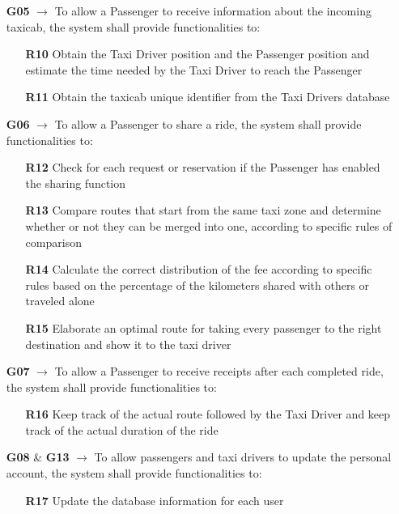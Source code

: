 \begin{itemize}
	\item [\textbf{G05}] $\rightarrow$ To allow a Passenger to receive information about the incoming taxicab, the system shall provide functionalities to:
	\begin{itemize}
		\item [\textbf{R10}] Obtain the Taxi Driver position and the Passenger position and estimate the time needed by the Taxi Driver to reach the Passenger
		\item [\textbf{R11}] Obtain the taxicab unique identifier from the Taxi Drivers database
	\end{itemize}
	
	\item [\textbf{G06}] $\rightarrow$ To allow a Passenger to share a ride, the system shall provide functionalities to:
	\begin{itemize}
		\item [\textbf{R12}] Check for each request or reservation if the Passenger has enabled the sharing function
		\item [\textbf{R13}] Compare routes that start from the same taxi zone and determine whether or not they can be merged into one, according to specific rules of comparison
		\item [\textbf{R14}] Calculate the correct distribution of the fee according to specific rules based on the percentage of the kilometers shared with others or traveled alone
		\item [\textbf{R15}] Elaborate an optimal route for taking every passenger to the right destination and show it to the taxi driver
	\end{itemize}

	\item [\textbf{G07}] $\rightarrow$ To allow a Passenger to receive receipts after each completed ride, the system shall provide functionalities to:
	\begin{itemize}
		\item [\textbf{R16}] Keep track of the actual route followed by the Taxi Driver and keep track of the actual duration of the ride
	\end{itemize}
	
	\item [\textbf{G08}] \& \textbf{G13} $\rightarrow$ To allow passengers and taxi drivers to update the personal account, the system shall provide functionalities to:
	\begin{itemize}
		\item [\textbf{R17}] Update the database information for each user
	\end{itemize}
	

\end{itemize}
